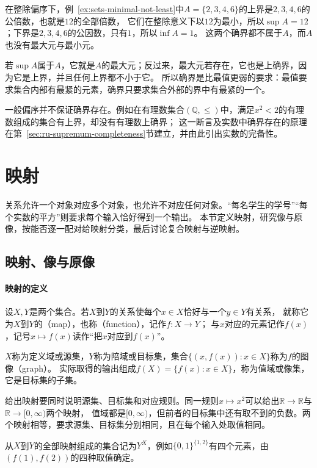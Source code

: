 在整除偏序下，例~\ref{ex:sets-minimal-not-least}中$A=\{2,3,4,6\}$的上界是$2,3,4,6$的公倍数，也就是$12$的全部倍数，
它们在整除意义下以$12$为最小，所以$\sup A=12$；下界是$2,3,4,6$的公因数，只有$1$，所以$\inf A=1$。
这两个确界都不属于$A$，而$A$也没有最大元与最小元。

若$\sup A$属于$A$，它就是$A$的最大元；反过来，最大元若存在，它也是上确界，因为它是上界，并且任何上界都不小于它。
所以确界是比最值更弱的要求：最值要求集合内部有最紧的元素，确界只要求集合外部的界中有最紧的一个。

一般偏序并不保证确界存在。例如在有理数集合$(\mathbb Q,\leq)$中，满足$x^2<2$的有理数组成的集合有上界，却没有有理数上确界；
这一断言及实数中确界存在的原理在第~\ref{sec:ru-supremum-completeness}节建立，并由此引出实数的完备性。

\section{映射}
\label{sec:prelim-functions-value-ranges}

关系允许一个对象对应多个对象，也允许不对应任何对象。“每名学生的学号”“每个实数的平方”则要求每个输入恰好得到一个输出。
本节定义映射，研究像与原像，按能否逐一配对给映射分类，最后讨论复合映射与逆映射。

\subsection{映射、像与原像}
\label{sec:prelim-function-definition}

\paragraph{映射的定义}
设$X,Y$是两个集合。若$X$到$Y$的关系使每个$x\in X$恰好与一个$y\in Y$有关系，
就称它为$X$到$Y$的（map），也称（function），记作$f:X\to Y$；
与$x$对应的元素记作$f(x)$，记号$x\mapsto f(x)$读作“把$x$对应到$f(x)$”。

$X$称为定义域或源集，$Y$称为陪域或目标集，集合$\{(x,f(x)):x\in X\}$称为$f$的图像（graph）。
实际取得的输出组成$f(X)=\{f(x):x\in X\}$，称为值域或像集，它是目标集的子集。

给出映射要同时说明源集、目标集和对应规则。同一规则$x\mapsto x^2$可以给出$\mathbb R\to\mathbb R$与$\mathbb R\to[0,\infty)$两个映射，
值域都是$[0,\infty)$，但前者的目标集中还有取不到的负数。两个映射相等，要求源集、目标集分别相同，且在每个输入处取值相同。

从$X$到$Y$的全部映射组成的集合记为$Y^X$，例如$\{0,1\}^{\{1,2\}}$有四个元素，由$(f(1),f(2))$的四种取值确定。


